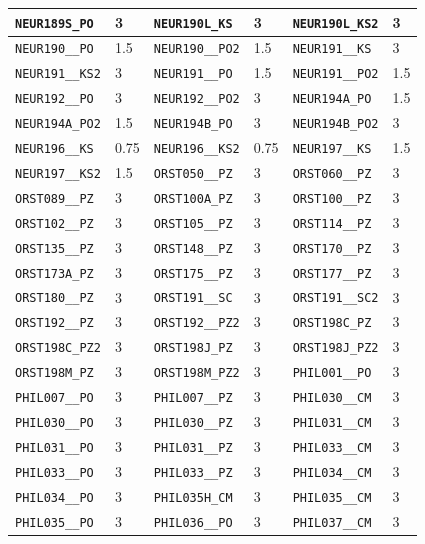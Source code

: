 \begin{longtable}{|l|l||l|l||l|l|}
    \verb|NEUR189S_PO| & 3 & \verb|NEUR190L_KS| & 3 & \verb|NEUR190L_KS2| & 3\\\hline
    \verb|NEUR190__PO| & 1.5 & \verb|NEUR190__PO2| & 1.5 & \verb|NEUR191__KS| & 3\\\hline
    \verb|NEUR191__KS2| & 3 & \verb|NEUR191__PO| & 1.5 & \verb|NEUR191__PO2| & 1.5\\\hline
    \verb|NEUR192__PO| & 3 & \verb|NEUR192__PO2| & 3 & \verb|NEUR194A_PO| & 1.5\\\hline
    \verb|NEUR194A_PO2| & 1.5 & \verb|NEUR194B_PO| & 3 & \verb|NEUR194B_PO2| & 3\\\hline
    \verb|NEUR196__KS| & 0.75 & \verb|NEUR196__KS2| & 0.75 & \verb|NEUR197__KS| & 1.5\\\hline
    \verb|NEUR197__KS2| & 1.5 & \verb|ORST050__PZ| & 3 & \verb|ORST060__PZ| & 3\\\hline
    \verb|ORST089__PZ| & 3 & \verb|ORST100A_PZ| & 3 & \verb|ORST100__PZ| & 3\\\hline
    \verb|ORST102__PZ| & 3 & \verb|ORST105__PZ| & 3 & \verb|ORST114__PZ| & 3\\\hline
    \verb|ORST135__PZ| & 3 & \verb|ORST148__PZ| & 3 & \verb|ORST170__PZ| & 3\\\hline
    \verb|ORST173A_PZ| & 3 & \verb|ORST175__PZ| & 3 & \verb|ORST177__PZ| & 3\\\hline
    \verb|ORST180__PZ| & 3 & \verb|ORST191__SC| & 3 & \verb|ORST191__SC2| & 3\\\hline
    \verb|ORST192__PZ| & 3 & \verb|ORST192__PZ2| & 3 & \verb|ORST198C_PZ| & 3\\\hline
    \verb|ORST198C_PZ2| & 3 & \verb|ORST198J_PZ| & 3 & \verb|ORST198J_PZ2| & 3\\\hline
    \verb|ORST198M_PZ| & 3 & \verb|ORST198M_PZ2| & 3 & \verb|PHIL001__PO| & 3\\\hline
    \verb|PHIL007__PO| & 3 & \verb|PHIL007__PZ| & 3 & \verb|PHIL030__CM| & 3\\\hline
    \verb|PHIL030__PO| & 3 & \verb|PHIL030__PZ| & 3 & \verb|PHIL031__CM| & 3\\\hline
    \verb|PHIL031__PO| & 3 & \verb|PHIL031__PZ| & 3 & \verb|PHIL033__CM| & 3\\\hline
    \verb|PHIL033__PO| & 3 & \verb|PHIL033__PZ| & 3 & \verb|PHIL034__CM| & 3\\\hline
    \verb|PHIL034__PO| & 3 & \verb|PHIL035H_CM| & 3 & \verb|PHIL035__CM| & 3\\\hline
    \verb|PHIL035__PO| & 3 & \verb|PHIL036__PO| & 3 & \verb|PHIL037__CM| & 3\\\hline

\end{longtable}
